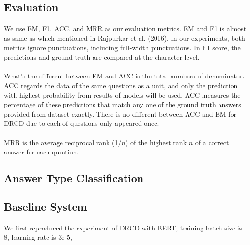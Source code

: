 \documentclass{article}
\begin{document}
\paragraph{}

\subsection{Evaluation}
\paragraph{}
We use EM, F1, ACC, and MRR as our evaluation metrics. EM and F1 is almost as same as which mentioned in Rajpurkar et al. (2016)\cite{rajpurkar2016squad}. In our experiments, both metrics ignore punctuations, including full-width punctuations. In F1 score, the predictions and ground truth are compared at the character-level.

\paragraph{}
What's the different between EM and ACC is the total numbers of denominator. ACC regards the data of the same questions as a unit, and only the prediction with highest probability from results of models will be used. ACC measures the percentage of these predictions that match any one of the ground truth answers provided from dataset exactly. There is no different between ACC and EM for DRCD due to each of questions only appeared once.

\paragraph{}
MRR is the average reciprocal rank (1/$n$) of the highest rank $n$ of a correct answer for each question.

\subsection{Answer Type Classification}
\paragraph{}


\subsection{Baseline System}
\paragraph{}
We first reproduced the experiment of DRCD with BERT, training batch size is 8, learning rate is 3e-5,
\end{document}
